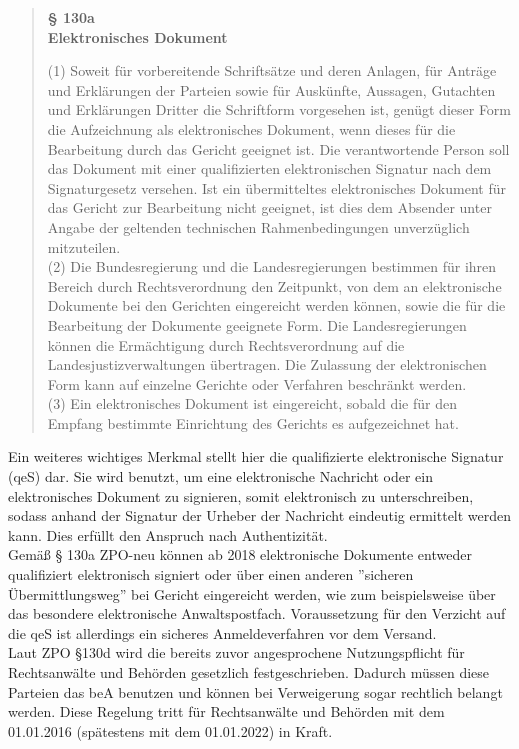 \begin{quote}
	\begin{center}
		\textbf{§ 130a} \\
		\textbf{Elektronisches Dokument}
	\end{center}
	(1) Soweit für vorbereitende Schriftsätze und deren Anlagen, für Anträge und Erklärungen der Parteien sowie für Auskünfte, Aussagen, Gutachten und Erklärungen Dritter die Schriftform vorgesehen ist, genügt dieser Form die Aufzeichnung als elektronisches Dokument, wenn dieses für die Bearbeitung durch das Gericht geeignet ist. Die verantwortende Person soll das Dokument mit einer qualifizierten elektronischen Signatur nach dem Signaturgesetz versehen. Ist ein übermitteltes elektronisches Dokument für das Gericht zur Bearbeitung nicht geeignet, ist dies dem Absender unter Angabe der geltenden technischen Rahmenbedingungen unverzüglich mitzuteilen. \\
	(2) Die Bundesregierung und die Landesregierungen bestimmen für ihren Bereich durch Rechtsverordnung den Zeitpunkt, von dem an elektronische Dokumente bei den Gerichten eingereicht werden können, sowie die für die Bearbeitung der Dokumente geeignete Form. Die Landesregierungen können die Ermächtigung durch Rechtsverordnung auf die Landesjustizverwaltungen übertragen. Die Zulassung der elektronischen Form kann auf einzelne Gerichte oder Verfahren beschränkt werden. \\
	(3) Ein elektronisches Dokument ist eingereicht, sobald die für den Empfang bestimmte Einrichtung des Gerichts es aufgezeichnet hat.
\end{quote}

Ein weiteres wichtiges Merkmal stellt hier die qualifizierte elektronische Signatur (qeS) dar. Sie wird benutzt, um eine elektronische Nachricht oder ein elektronisches Dokument zu signieren, somit elektronisch zu unterschreiben, sodass anhand der Signatur der Urheber der Nachricht eindeutig ermittelt werden kann. Dies erfüllt den Anspruch nach Authentizität. \\
Gemäß § 130a ZPO-neu \textcite{bea:bea:zpo130} können ab 2018 elektronische Dokumente entweder qualifiziert elektronisch signiert oder über einen anderen ''sicheren Übermittlungsweg'' bei Gericht eingereicht werden, wie zum beispielsweise über das besondere elektronische Anwaltspostfach. Voraussetzung für den Verzicht auf die qeS ist allerdings ein sicheres Anmeldeverfahren vor dem Versand.
\\
Laut ZPO §130d \textcite{bea:bea:zpo130} wird die bereits zuvor angesprochene Nutzungspflicht für Rechtsanwälte und Behörden gesetzlich festgeschrieben. Dadurch müssen diese Parteien das beA benutzen und können bei Verweigerung sogar rechtlich belangt werden. Diese Regelung tritt für Rechtsanwälte und Behörden mit dem 01.01.2016 (spätestens mit dem 01.01.2022) in Kraft.

